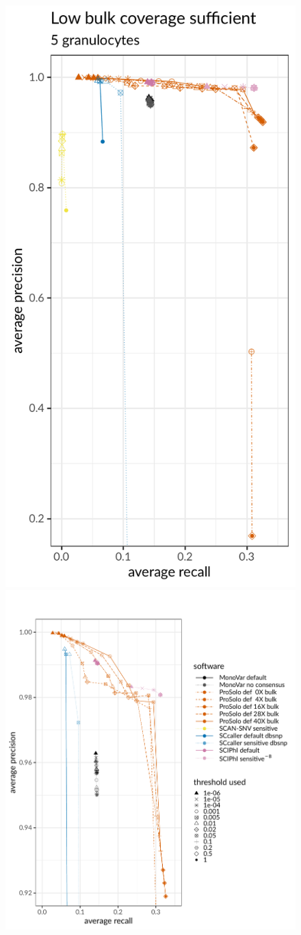 \documentclass[authoryear,preprint,11pt]{scrartcl}
\begin{document}
\begin{figure}[!tpb]
 \begin{minipage}[t]{.4\linewidth}
  \includegraphics[height=70ex]{figs/Laehnemann2017/Laehnemann2017_prosolo-downsampling_prosolo-monovar-scansnv-sccaller-sciphi_precision-recall-plot_focus-top-left.pdf}
 \end{minipage}
 \begin{minipage}[t]{.58\linewidth}
  \includegraphics[height=70ex]{figs/Laehnemann2017/Laehnemann2017_prosolo-downsampling_prosolo-monovar-scansnv-sccaller-sciphi_precision-recall-plot_focus-top-left_non-zero-bulk.pdf}

\end{minipage}
\end{figure}
\end{document}
